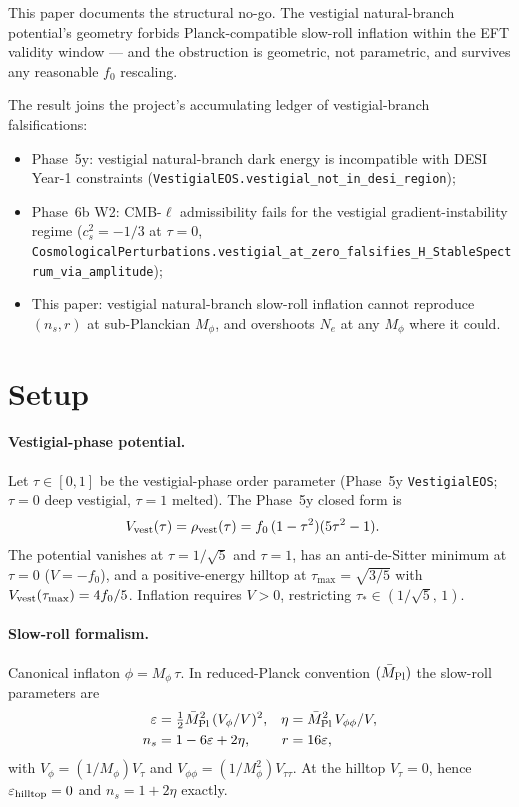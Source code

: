 \documentclass[twocolumn]{revtex4-2}
\newcommand{\Mpl}{\bar M_{\rm Pl}}
\newcommand{\Mphi}{M_\phi}
\newcommand{\fzero}{f_0}
\newcommand{\Vrho}{V_{\rm vest}}
\newcommand{\nS}{n_s}
\newcommand{\rT}{r}
\newcommand{\Ne}{N_e}
\newcommand{\eps}{\varepsilon}
\begin{document}
This paper documents the structural no-go. The vestigial natural-branch
potential's geometry forbids Planck-compatible slow-roll inflation
within the EFT validity window — and the obstruction is geometric, not
parametric, and survives any reasonable $\fzero$ rescaling.

The result joins the project's accumulating ledger of vestigial-branch
falsifications:
\begin{itemize}
\item Phase~5y: vestigial natural-branch dark energy is incompatible
   with DESI Year-1 constraints
   (\texttt{VestigialEOS.vestigial\_not\_in\_desi\_region});
\item Phase~6b W2: CMB-$\ell$ admissibility fails for the vestigial
   gradient-instability regime ($c_s^2 = -1/3$ at $\tau=0$,
   \texttt{CosmologicalPerturbations.vestigial\_at\_zero\_falsifies\_H\_StableSpectrum\_via\_amplitude});
\item This paper: vestigial natural-branch slow-roll inflation cannot
   reproduce $(\nS, \rT)$ at sub-Planckian $\Mphi$, and overshoots
   $\Ne$ at any $\Mphi$ where it could.
\end{itemize}

\section{Setup}
\label{sec:setup}

\paragraph{Vestigial-phase potential.}
Let $\tau\in[0,1]$ be the vestigial-phase order parameter (Phase~5y
\texttt{VestigialEOS}; $\tau=0$ deep vestigial, $\tau=1$ melted).
The Phase~5y closed form is
\begin{align}
\Vrho(\tau) &= \rho_{\rm vest}(\tau)
   = \fzero\,(1-\tau^2)(5\tau^2 - 1).
\end{align}
The potential vanishes at $\tau = 1/\sqrt{5}$ and $\tau = 1$, has an
anti-de-Sitter minimum at $\tau=0$ ($V=-\fzero$), and a positive-energy
hilltop at $\tau_{\max} = \sqrt{3/5}$ with $\Vrho(\tau_{\max}) = 4\fzero/5$.
Inflation requires $V>0$, restricting $\tau_*\in(1/\sqrt{5},\,1)$.

\paragraph{Slow-roll formalism.}
Canonical inflaton $\phi = \Mphi\,\tau$. In reduced-Planck convention
$(\Mpl)$ the slow-roll parameters are
\begin{align}
\eps &= \tfrac{1}{2}\Mpl^2\,(V_\phi/V)^2,
& \eta &= \Mpl^2\,V_{\phi\phi}/V, \\
\nS &= 1 - 6\eps + 2\eta,
& \rT &= 16\eps,
\end{align}
with $V_\phi = (1/\Mphi)V_\tau$ and $V_{\phi\phi}=(1/\Mphi^2)V_{\tau\tau}$.
At the hilltop $V_\tau = 0$, hence $\eps_{\rm hilltop}=0$ and
$\nS = 1 + 2\eta$ exactly.
\end{document}
